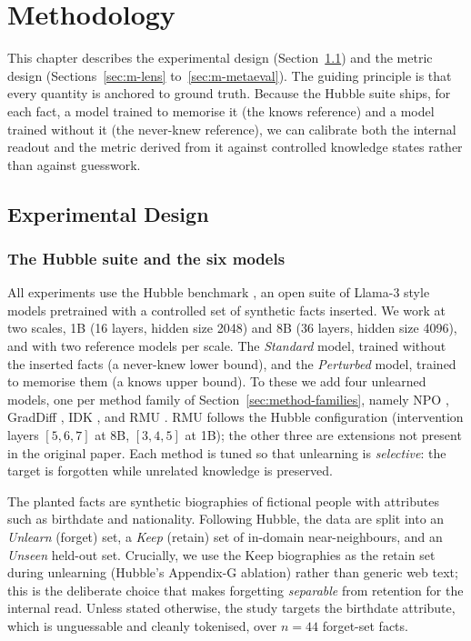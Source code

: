 \chapter{Methodology}
\label{ch:methodology}

This chapter describes the experimental design (Section~\ref{sec:m-design}) and the metric design
(Sections~\ref{sec:m-lens} to~\ref{sec:m-metaeval}). The guiding principle is that every quantity is
anchored to ground truth. Because the Hubble suite ships, for each fact, a model trained to memorise it
(the knows reference) and a model trained without it (the never-knew reference), we can calibrate both the
internal readout and the metric derived from it against controlled knowledge states rather than against
guesswork.

\section{Experimental Design}
\label{sec:m-design}

\subsection{The Hubble suite and the six models}
\label{sec:m-models}

All experiments use the Hubble benchmark \citep{allegro2025hubble}, an open suite of Llama-3 style models
pretrained with a controlled set of synthetic facts inserted. We work at two scales, 1B (16 layers,
hidden size 2048) and 8B (36 layers, hidden size 4096), and with two reference models per scale. The
\emph{Standard} model, trained without the inserted facts (a never-knew lower bound), and the
\emph{Perturbed} model, trained to memorise them (a knows upper bound). To these we add four unlearned
models, one per method family of Section~\ref{sec:method-families}, namely NPO \citep{zhang2024npo}, GradDiff
\citep{jang2022knowledge}, IDK \citep{maini2024tofu}, and RMU \citep{li2024wmdp}. RMU follows the Hubble
configuration (intervention layers $[5,6,7]$ at 8B, $[3,4,5]$ at 1B); the other three are extensions not
present in the original paper. Each method is tuned so that unlearning is \emph{selective}: the target is
forgotten while unrelated knowledge is preserved.

The planted facts are synthetic biographies of fictional people with attributes such as birthdate and
nationality. Following Hubble, the data are split into an \emph{Unlearn} (forget) set, a \emph{Keep}
(retain) set of in-domain near-neighbours, and an \emph{Unseen} held-out set. Crucially, we use the Keep
biographies as the retain set during unlearning (Hubble's Appendix-G ablation) rather than generic web
text; this is the deliberate choice that makes forgetting \emph{separable} from retention for the internal
read. Unless stated otherwise, the study targets the birthdate attribute, which is unguessable and cleanly
tokenised, over $n = 44$ forget-set facts.

